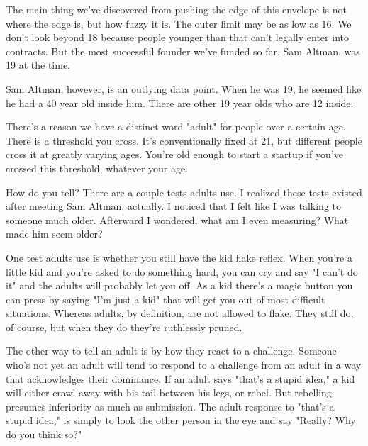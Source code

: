 The main thing we've
                    discovered from pushing the edge of this envelope is not
                    where the edge is, but how fuzzy it is. The outer limit may
                    be as low as 16. We don't look beyond 18 because people
                    younger than that can't legally enter into contracts. But
                    the most successful founder we've funded so far, Sam Altman,
                    was 19 at the time.

Sam Altman, however, is an
                    outlying data point. When he was 19, he seemed like he had a
                    40 year old inside him. There are other 19 year olds who are
                    12 inside.

There's a reason we have a distinct
                    word "adult" for people over a certain age. There is a
                    threshold you cross. It's conventionally fixed at 21, but
                    different people cross it at greatly varying ages. You're
                    old enough to start a startup if you've crossed this
                    threshold, whatever your age.

How do you tell?
                    There are a couple tests adults use. I realized these tests
                    existed after meeting Sam Altman, actually. I noticed that I
                    felt like I was talking to someone much older. Afterward I
                    wondered, what am I even measuring? What made him seem
                    older?

One test adults use is whether you still
                    have the kid flake reflex. When you're a little kid and
                    you're asked to do something hard, you can cry and say "I
                    can't do it" and the adults will probably let you off. As a
                    kid there's a magic button you can press by saying "I'm just
                    a kid" that will get you out of most difficult situations.
                    Whereas adults, by definition, are not allowed to flake.
                    They still do, of course, but when they do they're
                    ruthlessly pruned.

The other way to tell an adult
                    is by how they react to a challenge. Someone who's not yet
                    an adult will tend to respond to a challenge from an adult
                    in a way that acknowledges their dominance. If an adult says
                    "that's a stupid idea," a kid will either crawl away with
                    his tail between his legs, or rebel. But rebelling presumes
                    inferiority as much as submission. The adult response to
                    "that's a stupid idea," is simply to look the other person
                    in the eye and say "Really? Why do you think so?"

